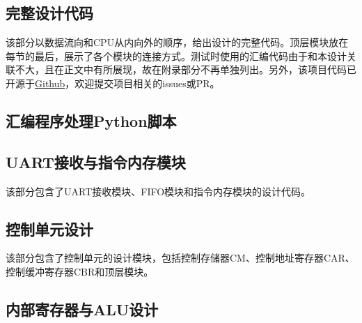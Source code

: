 \documentclass[lang=cn,a4paper,newtx]{elegantpaper}
\begin{document}
\nocite{FPGA-CPU}
\newpage
\printbibliography
\newpage
\addappheadtotoc
\begin{appendices}
  \section{完整设计代码}
  该部分以数据流向和CPU从内向外的顺序，给出设计的完整代码。顶层模块放在每节的最后，展示了各个模块的连接方式。测试时使用的汇编代码由于和本设计关联不大，且在正文中有所展现，故在附录部分不再单独列出。另外，该项目代码已开源于\href{https://github.com/LiPtP0000/CPU_Design}{Github}，欢迎提交项目相关的issues或PR。
  \subsection{汇编程序处理Python脚本}\label{sec:appendices:python}
  
  \subsection{UART接收与指令内存模块}\label{sec:appendices:uart}
  该部分包含了UART接收模块、FIFO模块和指令内存模块的设计代码。
  
  
  
  
  
  
  
  \subsection{控制单元设计}\label{sec:appendices:control}
  该部分包含了控制单元的设计模块，包括控制存储器CM、控制地址寄存器CAR、控制缓冲寄存器CBR和顶层模块。
  
  
  
  
  \subsection{内部寄存器与ALU设计}\label{sec:appendices:alu}
  
  
  
  
  
  
  

\end{appendices}
\end{document}
